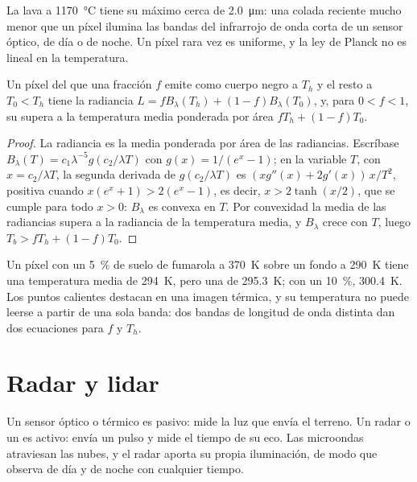 La lava a \qty{1170}{\celsius} tiene su máximo cerca de \qty{2.0}{\micro\metre}: una
colada reciente mucho menor que un píxel ilumina las bandas del infrarrojo de onda corta
de un sensor óptico, de día o de noche. Un píxel rara vez es uniforme, y
la ley de Planck no es lineal en la temperatura.

\begin{proposition}\label{prop:b3:remote-sensing-gis:mixed}
Un píxel del que una fracción $f$ emite como cuerpo negro a $T_h$ y el resto
a $T_0 < T_h$ tiene la radiancia $L = fB_\lambda(T_h) + (1 - f)B_\lambda(T_0)$,
y, para $0 < f < 1$, su  supera a la
temperatura media ponderada por área $fT_h + (1 - f)T_0$.
\end{proposition}

\begin{proof}
La radiancia es la media ponderada por área de las radiancias. Escríbase $B_\lambda(T)
= c_1\lambda^{-5}g(c_2/\lambda T)$ con $g(x) = 1/(e^x - 1)$; en la
variable $T$, con $x = c_2/\lambda T$, la segunda derivada de
$g(c_2/\lambda T)$ es $(x g''(x) + 2g'(x))\,x/T^2$, positiva cuando $x(e^x + 1)
> 2(e^x - 1)$, es decir, $x > 2\tanh(x/2)$, que se cumple para todo $x > 0$:
$B_\lambda$ es convexa en $T$. Por convexidad
la media de las radiancias supera a la radiancia de la temperatura media, y
$B_\lambda$ crece con $T$, luego $T_b > fT_h + (1 - f)T_0$.
\end{proof}

Un píxel con un \qty{5}{\percent} de
suelo de fumarola a \qty{370}{K} sobre un fondo a \qty{290}{K} tiene una
temperatura media de \qty{294}{K}, pero una  de \qty{295.3}{K};
con un \qty{10}{\percent}, \qty{300.4}{K}. Los puntos calientes destacan en una
imagen térmica, y su temperatura no puede leerse a partir de una sola banda: dos bandas
de longitud de onda distinta dan dos ecuaciones para $f$ y $T_h$.

\section{Radar y lidar}\label{sec:b3:remote-sensing-gis:radar}

Un sensor óptico o térmico es pasivo: mide la luz que envía el terreno. Un radar o un
 es activo: envía un pulso y mide el tiempo de su eco.
Las microondas atraviesan las nubes, y el radar aporta su propia iluminación,
de modo que observa de día y de noche con cualquier tiempo.

